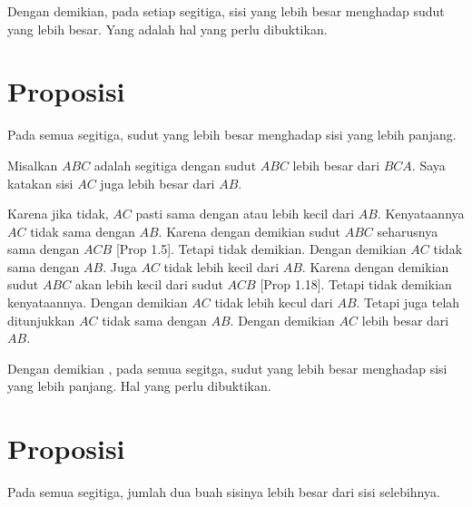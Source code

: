\documentclass[a4paper]{book}
\begin{document}
Dengan demikian, pada setiap segitiga, sisi yang lebih besar menghadap sudut
yang lebih besar. Yang adalah hal yang perlu dibuktikan.

\section*{\centering Proposisi \thesection} 
Pada semua segitiga, sudut yang lebih besar menghadap sisi yang lebih panjang.
\begin{center}
\end{center} 

Misalkan $ABC$ adalah segitiga dengan sudut $ABC$ lebih besar dari $BCA$. 
Saya katakan sisi $AC$ juga lebih besar dari $AB$.

Karena jika tidak, $AC$ pasti sama dengan atau lebih kecil dari $AB$. Kenyataannya
$AC$ tidak sama dengan $AB$. Karena dengan demikian sudut $ABC$ seharusnya sama 
dengan $ACB$ [Prop 1.5]. Tetapi tidak demikian. Dengan demikian $AC$ tidak 
sama dengan $AB$. Juga $AC$ tidak lebih kecil dari $AB$. Karena dengan
demikian sudut $ABC$ akan lebih kecil dari sudut $ACB$ [Prop 1.18]. Tetapi
tidak demikian kenyataannya. Dengan demikian $AC$ tidak lebih kecul dari 
$AB$. Tetapi juga telah ditunjukkan $AC$ tidak sama dengan $AB$. Dengan demikian
$AC$ lebih besar dari $AB$.

Dengan demikian , pada semua segitga, sudut yang lebih besar menghadap sisi yang
lebih panjang. Hal yang perlu dibuktikan.

\section*{\centering Proposisi \thesection}
Pada semua segitiga, jumlah dua buah sisinya lebih besar dari sisi selebihnya.

\begin{center}
\end{center}
\end{document}
